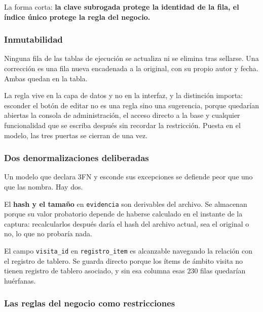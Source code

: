 \documentclass[10pt,letterpaper]{article}
\begin{document}
La forma corta: \textbf{la clave subrogada protege la identidad de la fila, el
índice único protege la regla del negocio.}

\subsubsection*{Inmutabilidad}

Ninguna fila de las tablas de ejecución se actualiza ni se elimina tras
sellarse. Una corrección es una fila nueva encadenada a la original, con su
propio autor y fecha. Ambas quedan en la tabla.

La regla vive en la capa de datos y no en la interfaz, y la distinción importa:
esconder el botón de editar no es una regla sino una sugerencia, porque
quedarían abiertas la consola de administración, el acceso directo a la base y
cualquier funcionalidad que se escriba después sin recordar la restricción.
Puesta en el modelo, las tres puertas se cierran de una vez.

\subsubsection*{Dos denormalizaciones deliberadas}

Un modelo que declara 3FN y esconde sus excepciones se defiende peor que uno
que las nombra. Hay dos.

El \textbf{hash y el tamaño} en \texttt{evidencia} son derivables del archivo.
Se almacenan porque su valor probatorio depende de haberse calculado en el
instante de la captura: recalcularlos después daría el hash del archivo actual,
sea el original o no, lo que no probaría nada.

El campo \texttt{visita\_id} en \texttt{registro\_item} es alcanzable navegando
la relación con el registro de tablero. Se guarda directo porque los ítems de
ámbito visita no tienen registro de tablero asociado, y sin esa columna esas
230 filas quedarían huérfanas.

\subsubsection*{Las reglas del negocio como restricciones}
\end{document}
